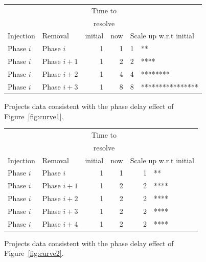 \documentclass{sig-alternate}
\newcommand{\fig}[1]{Figure~\ref{fig:#1}}
\begin{document}
\begin{figure}[!t]
\scriptsize
\begin{center}
\begin{tabular}{l@{~}|l@{~}|r@{~}r@{~}|r@{~}l}
          &        & \multicolumn{2}{c|}{Time to}  &\\
          &        & \multicolumn{2}{c|}{resolve} &\\
Injection & Removal& initial & now & \multicolumn{2}{l}{Scale up w.r.t initial} \\\hline
Phase $i$&Phase $i$ & 1 & 1 & 1 & **\\
Phase $i$ &Phase $i+1$ & 1 & 2& 2 & **** \\
Phase $i$ &Phase $i+2$ & 1 & 4& 4 &******** \\
Phase $i$ &Phase $i+3$ & 1 & 8 & 8 & ****************  
  \end{tabular}\end{center}
 \caption{Projects data consistent with
 the phase delay effect of \fig{curve1}.}\label{fig:curve1a}
\end{figure}

\begin{figure}[!t]
\scriptsize
\begin{center}
\begin{tabular}{l@{~}|l@{~}|r@{~}r@{~}|r@{~}l}
          &        & \multicolumn{2}{c|}{Time to}  &\\
          &        & \multicolumn{2}{c|}{resolve} &\\
Injection & Removal& initial & now & \multicolumn{2}{l}{Scale up w.r.t initial} \\\hline
Phase $i$&Phase $i$ & 1 & 1 & 1 & ** \\
Phase $i$ &Phase $i+1$ & 1 & 2& 2 & **** \\
Phase $i$ &Phase $i+2$ & 1 & 2& 2 & **** \\
Phase $i$ &Phase $i+3$ & 1 & 2 & 2 & **** \\
 Phase $i$  &Phase $i+4$ &1 & 2& 2 &**** 
  \end{tabular}\end{center}
 \caption{Projects data consistent with
 the phase delay effect of \fig{curve2}.}\label{fig:curve2a}
\end{figure}
 
\end{document}
